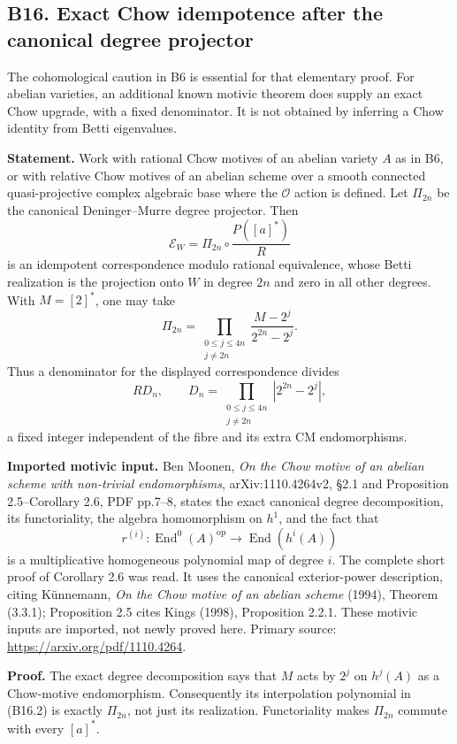\subsection{B16. Exact Chow idempotence after the canonical degree projector}\label{b16.-exact-chow-idempotence-after-the-canonical-degree-projector}

The cohomological caution in B6 is essential for that elementary proof. For abelian varieties, an additional known motivic theorem does supply an exact Chow upgrade, with a fixed denominator. It is not obtained by inferring a Chow identity from Betti eigenvalues.

\textbf{Statement.} Work with rational Chow motives of an abelian variety \(A\) as in B6, or with relative Chow motives of an abelian scheme over a smooth connected quasi-projective complex algebraic base where the \(\mathcal O\) action is defined. Let \(\Pi_{2n}\) be the canonical Deninger--Murre degree projector. Then \[
 \mathcal E_W=\Pi_{2n}\circ\frac{P([a]^*)}{R}
\tag{B16.1}
\] is an idempotent correspondence modulo rational equivalence, whose Betti realization is the projection onto \(W\) in degree \(2n\) and zero in all other degrees. With \(M=[2]^*\), one may take \[
 \Pi_{2n}=\prod_{\substack{0\le j\le4n\\j\ne2n}}
              \frac{M-2^j}{2^{2n}-2^j}.
\tag{B16.2}
\] Thus a denominator for the displayed correspondence divides \[
 R D_n,\qquad
 D_n=\prod_{\substack{0\le j\le4n\\j\ne2n}}|2^{2n}-2^j|,
\] a fixed integer independent of the fibre and its extra CM endomorphisms.

\textbf{Imported motivic input.} Ben Moonen, \emph{On the Chow motive of an abelian scheme with non-trivial endomorphisms}, arXiv:1110.4264v2, §2.1 and Proposition 2.5--Corollary 2.6, PDF pp.7--8, states the exact canonical degree decomposition, its functoriality, the algebra homomorphism on \(h^1\), and the fact that \[
 r^{(i)}:\operatorname{End}^0(A)^{\mathrm{op}}
       \longrightarrow\operatorname{End}(h^i(A))
\] is a multiplicative homogeneous polynomial map of degree \(i\). The complete short proof of Corollary 2.6 was read. It uses the canonical exterior-power description, citing Künnemann, \emph{On the Chow motive of an abelian scheme} (1994), Theorem (3.3.1); Proposition 2.5 cites Kings (1998), Proposition 2.2.1. These motivic inputs are imported, not newly proved here. Primary source: \url{https://arxiv.org/pdf/1110.4264}.

\textbf{Proof.} The exact degree decomposition says that \(M\) acts by \(2^j\) on \(h^j(A)\) as a Chow-motive endomorphism. Consequently its interpolation polynomial in (B16.2) is exactly \(\Pi_{2n}\), not just its realization. Functoriality makes \(\Pi_{2n}\) commute with every \([a]^*\).

